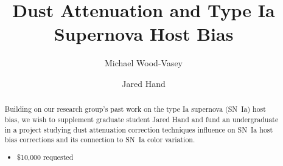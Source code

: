 \documentclass[modern]{aastex63}
\begin{document}
\title{Dust Attenuation and Type Ia Supernova Host Bias}


\author{Michael Wood-Vasey}

\author{Jared Hand}

\begin{abstract}
    Building on our research group's past work on the type Ia supernova (SN~Ia) host bias, we wish to supplement graduate student Jared Hand and fund an undergraduate in a project studying dust attenuation correction techniques influence on SN~Ia host bias corrections and its connection to SN~Ia color variation.
    \begin{itemize}
        \item \$10,000 requested
    \end{itemize}
\end{abstract}
\end{document}
